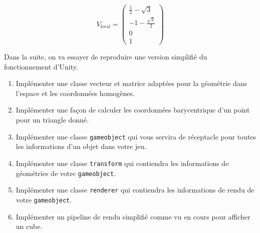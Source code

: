 \documentclass[a4paper,12pt]{article}
\begin{document}
\begin{enumerate}
      \[
      \boxed{
      V_{\text{local}} =
      \begin{pmatrix}
      \frac{1}{2} - \sqrt{3} \\
      -1 - \frac{\sqrt{3}}{2} \\
      0 \\
      1
      \end{pmatrix}
      }
      \]

\end{enumerate}

\label{exo:impl}

Dans la suite, on va essayer de reproduire une version simplifié du fonctionnement d'Unity. 

\begin{enumerate}
  \item Implémenter une classe vecteur et matrice adaptées pour la géométrie dans l'espace et les coordonnées homogènes.
  \item Implémenter une façon de calculer les coordonnées barycentrique d'un point pour un triangle donné. 
  \item Implémenter une classe \texttt{gameobject} qui vous servira de réceptacle pour toutes les informations d'un objet dans votre jeu.
  \item Implémenter une classe \texttt{transform} qui contiendra les informations de géométries de votre \texttt{gameobject}.
  \item Implémenter une classe \texttt{renderer} qui contiendra les informations de rendu de votre \texttt{gameobject}.
  \item Implémenter un pipeline de rendu simplifié comme vu en cours pour afficher un cube.
\end{enumerate}
\end{document}
